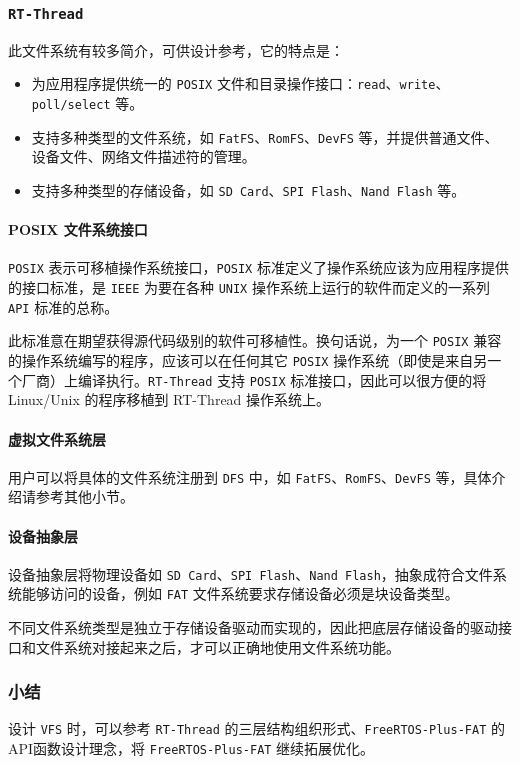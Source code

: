\documentclass[a4paper]{article}
\begin{document}
\subsubsection{\texttt{RT-Thread}}
此文件系统有较多简介，可供设计参考，它的特点是：
\begin{itemize}
    \item 为应用程序提供统一的 \texttt{POSIX} 文件和目录操作接口：\texttt{read}、\texttt{write}、\texttt{poll/select} 等。
    \item 支持多种类型的文件系统，如 \texttt{FatFS}、\texttt{RomFS}、\texttt{DevFS} 等，并提供普通文件、设备文件、网络文件描述符的管理。
    \item 支持多种类型的存储设备，如 \texttt{SD Card}、\texttt{SPI Flash}、\texttt{Nand Flash} 等。
\end{itemize}
\paragraph{POSIX 文件系统接口}

\texttt{POSIX} 表示可移植操作系统接口，\texttt{POSIX} 标准定义了操作系统应该为应用程序提供的接口标准，是 \texttt{IEEE} 为要在各种 \texttt{UNIX} 操作系统上运行的软件而定义的一系列 \texttt{API} 标准的总称。

此标准意在期望获得源代码级别的软件可移植性。换句话说，为一个 \texttt{POSIX} 兼容的操作系统编写的程序，应该可以在任何其它 \texttt{POSIX} 操作系统（即使是来自另一个厂商）上编译执行。\texttt{RT-Thread} 支持 \texttt{POSIX} 标准接口，因此可以很方便的将 Linux/Unix 的程序移植到 RT-Thread 操作系统上。

\paragraph{虚拟文件系统层}
用户可以将具体的文件系统注册到 \texttt{DFS} 中，如 \texttt{FatFS}、\texttt{RomFS}、\texttt{DevFS} 等，具体介绍请参考其他小节。

\paragraph{设备抽象层}
设备抽象层将物理设备如 \texttt{SD Card}、\texttt{SPI Flash}、\texttt{Nand Flash}，抽象成符合文件系统能够访问的设备，例如 \texttt{FAT} 文件系统要求存储设备必须是块设备类型。

不同文件系统类型是独立于存储设备驱动而实现的，因此把底层存储设备的驱动接口和文件系统对接起来之后，才可以正确地使用文件系统功能。
\subsubsection{小结}
设计 \texttt{VFS} 时，可以参考 \texttt{RT-Thread} 的三层结构组织形式、\texttt{FreeRTOS-Plus-FAT} 的API函数设计理念，将 \texttt{FreeRTOS-Plus-FAT} 继续拓展优化。
\end{document}
